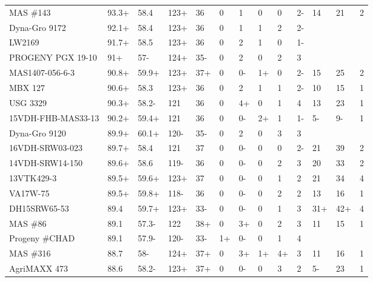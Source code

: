 \documentclass[12pt, letterpaper]{article}
\begin{document}
\begin{landscape}
\begin{ThreePartTable}
\begin{longtable}{lllllllllllll}
  MAS \#143 & 93.3+ & 58.4 & 123+ & 36 & 0 & 1 & 0 & 0 & 2- & 14 & 21 & 2 \\ 
  Dyna-Gro 9172 & 92.1+ & 58.4 & 123+ & 36 & 0 & 1 & 1 & 2 & 2- &  &  &  \\ 
  LW2169 & 91.7+ & 58.5 & 123+ & 36 & 0 & 2 & 1 & 0 & 1- &  &  &  \\ 
  PROGENY PGX 19-10 & 91+ & 57- & 124+ & 35- & 0 & 2 & 0 & 2 & 3 &  &  &  \\ 
  MAS1407-056-6-3 & 90.8+ & 59.9+ & 123+ & 37+ & 0 & 0- & 1+ & 0 & 2- & 15 & 25 & 2 \\ 
  MBX 127 & 90.6+ & 58.3 & 123+ & 36 & 0 & 2 & 1 & 1 & 2- & 10 & 15 & 1 \\ 
  USG 3329 & 90.3+ & 58.2- & 121 & 36 & 0 & 4+ & 0 & 1 & 4 & 13 & 23 & 1 \\ 
  15VDH-FHB-MAS33-13 & 90.2+ & 59.4+ & 121 & 36 & 0 & 0- & 2+ & 1 & 1- & 5- & 9- & 1 \\ 
  Dyna-Gro 9120 & 89.9+ & 60.1+ & 120- & 35- & 0 & 2 & 0 & 3 & 3 &  &  &  \\ 
  16VDH-SRW03-023 & 89.7+ & 58.4 & 121 & 37 & 0 & 0- & 0 & 0 & 2- & 21 & 39 & 2 \\ 
  14VDH-SRW14-150 & 89.6+ & 58.6 & 119- & 36 & 0 & 0- & 0 & 2 & 3 & 20 & 33 & 2 \\ 
  13VTK429-3 & 89.5+ & 59.6+ & 123+ & 37 & 0 & 0- & 0 & 1 & 2 & 21 & 34 & 4 \\ 
  VA17W-75 & 89.5+ & 59.8+ & 118- & 36 & 0 & 0- & 0 & 2 & 2 & 13 & 16 & 1 \\ 
  DH15SRW65-53 & 89.4 & 59.7+ & 123+ & 33- & 0 & 0- & 0 & 1 & 3 & 31+ & 42+ & 4 \\ 
  MAS \#86 & 89.1 & 57.3- & 122 & 38+ & 0 & 3+ & 0 & 2 & 3 & 11 & 15 & 1 \\ 
  Progeny \#CHAD & 89.1 & 57.9- & 120- & 33- & 1+ & 0- & 0 & 1 & 4 &  &  &  \\ 
  MAS \#316 & 88.7 & 58- & 124+ & 37+ & 0 & 3+ & 1+ & 4+ & 3 & 11 & 16 & 1 \\ 
  AgriMAXX 473 & 88.6 & 58.2- & 123+ & 37+ & 0 & 0- & 0 & 3 & 2 & 5- & 23 & 1 \\ 

\end{longtable}
\end{ThreePartTable}
\end{landscape}
\end{document}
